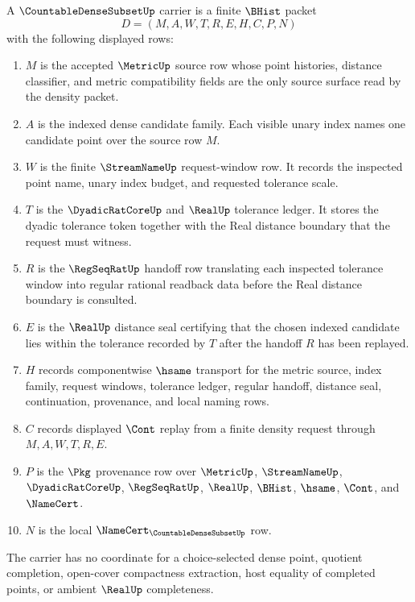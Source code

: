 \begin{definition}
\label{def:countable-dense-subset-carrier}
A $\CountableDenseSubsetUp$ carrier is a finite $\BHist$ packet
$$
D=(M,A,W,T,R,E,H,C,P,N)
$$
with the following displayed rows:
\begin{enumerate}
\item $M$ is the accepted $\MetricUp$ source row whose point histories, distance classifier, and metric compatibility fields are the only source surface read by the density packet.
\item $A$ is the indexed dense candidate family. Each visible unary index names one candidate point over the source row $M$.
\item $W$ is the finite $\StreamNameUp$ request-window row. It records the inspected point name, unary index budget, and requested tolerance scale.
\item $T$ is the $\DyadicRatCoreUp$ and $\RealUp$ tolerance ledger. It stores the dyadic tolerance token together with the Real distance boundary that the request must witness.
\item $R$ is the $\RegSeqRatUp$ handoff row translating each inspected tolerance window into regular rational readback data before the Real distance boundary is consulted.
\item $E$ is the $\RealUp$ distance seal certifying that the chosen indexed candidate lies within the tolerance recorded by $T$ after the handoff $R$ has been replayed.
\item $H$ records componentwise $\hsame$ transport for the metric source, index family, request windows, tolerance ledger, regular handoff, distance seal, continuation, provenance, and local naming rows.
\item $C$ records displayed $\Cont$ replay from a finite density request through $M,A,W,T,R,E$.
\item $P$ is the $\Pkg$ provenance row over $\MetricUp$, $\StreamNameUp$, $\DyadicRatCoreUp$, $\RegSeqRatUp$, $\RealUp$, $\BHist$, $\hsame$, $\Cont$, and $\NameCert$.
\item $N$ is the local $\NameCert_{\CountableDenseSubsetUp}$ row.
\end{enumerate}
The carrier has no coordinate for a choice-selected dense point, quotient completion, open-cover compactness extraction, host equality of completed points, or ambient $\RealUp$ completeness.
\end{definition}

